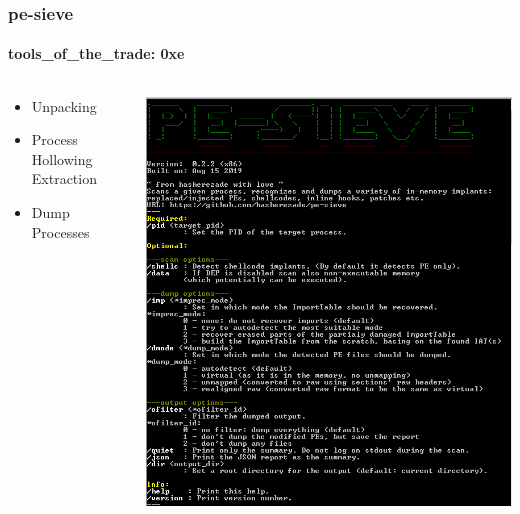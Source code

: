 \documentclass[aspectratio=169]{beamer}
\begin{document}
\begin{frame}
  \frametitle{pe-sieve}
  \framesubtitle{tools\_of\_the\_trade: 0xe}
  \begin{columns}
    \begin{column}{.5\textwidth}
      \begin{itemize}
      \item{Unpacking}
      \item{Process Hollowing Extraction}
      \item{Dump Processes}
      \end{itemize}
    \end{column}
    \hfill
    \begin{column}{.5\textwidth}
      \includegraphics[scale=.28]{pe-sieve}
    \end{column}
  \end{columns}
\end{frame}
\end{document}
